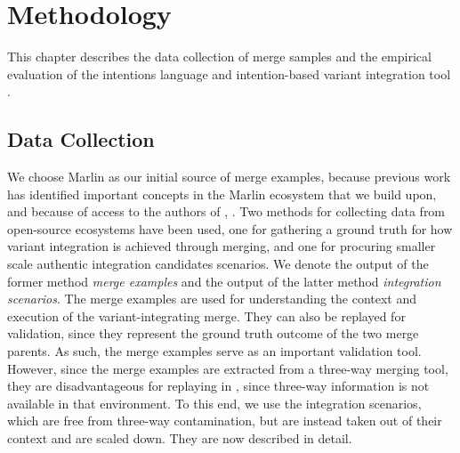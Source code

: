 \chapter{Methodology}
This chapter describes the data collection of merge samples and the empirical evaluation of the intentions language and intention-based variant integration tool \tooln.

\section{Data Collection}
We choose Marlin as our initial source of merge examples, because previous work has identified important concepts in the Marlin ecosystem that we build upon, and because of access to the authors of \cite{stanciulescu2015}, \cite{stanciulescu2016concepts}. Two methods for collecting data from open-source ecosystems have been used, one for gathering a ground truth for how variant integration is achieved through merging, and one for procuring smaller scale authentic integration candidates scenarios. We denote the output of the former method \textit{merge examples} and the output of the latter method \textit{integration scenarios}. The merge examples are used for understanding the context and execution of the variant-integrating merge. They can also be replayed for validation, since they represent the ground truth outcome of the two merge parents. As such, the merge examples serve as an important validation tool. However, since the merge examples are extracted from a three-way merging tool, they are disadvantageous for replaying in \tooln, since three-way information is not available in that environment. To this end, we use the integration scenarios, which are free from three-way contamination, but are instead taken out of their context and are scaled down. They are now described in detail.

